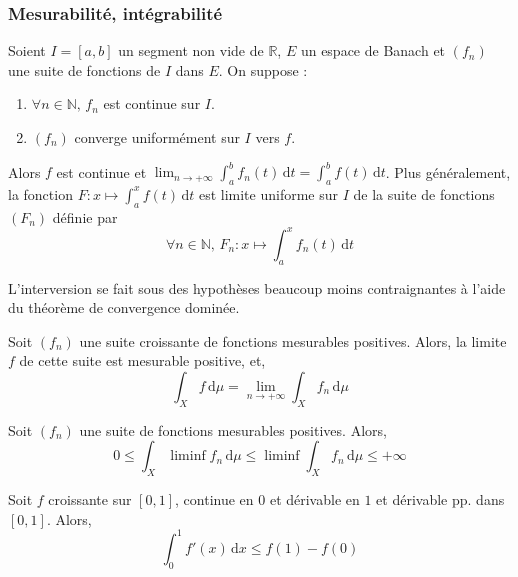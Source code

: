   \subsubsection{Mesurabilité, intégrabilité}


  \begin{theorem}
    Soient $I = [a,b]$ un segment non vide de $\mathbb{R}$, $E$ un espace de Banach et $(f_n)$ une suite de fonctions de $I$ dans $E$. On suppose :
    \begin{enumerate}[label=(\roman*)]
      \item $\forall n \in \mathbb{N}, \, f_n$ est continue sur $I$.
      \item $(f_n)$ converge uniformément sur $I$ vers $f$.
    \end{enumerate}
    Alors $f$ est continue et $\lim_{n \rightarrow +\infty} \int_a^b f_n(t) \, \mathrm{d}t = \int_a^b f(t) \, \mathrm{d}t$. Plus généralement, la fonction $F : x \mapsto \int_a^x f(t) \, \mathrm{d}t$ est limite uniforme sur $I$ de la suite de fonctions $(F_n)$ définie par
    \[ \forall n \in \mathbb{N}, \, F_n : x \mapsto \int_a^x f_n(t) \, \mathrm{d}t \]
  \end{theorem}

  \begin{remark}
    L'interversion se fait sous des hypothèses beaucoup moins contraignantes à l'aide du théorème de convergence dominée.
  \end{remark}


  \begin{theorem}
    Soit $(f_n)$ une suite croissante de fonctions mesurables positives. Alors, la limite $f$ de cette suite est mesurable positive, et,
    \[ \int_X f \, \mathrm{d}\mu = \lim_{n \rightarrow +\infty} \int_X f_n \, \mathrm{d}\mu \]
  \end{theorem}


  \begin{theorem}
    Soit $(f_n)$ une suite de fonctions mesurables positives. Alors,
    \[ 0 \leq \int_X \liminf f_n \, \mathrm{d}\mu \leq \liminf \int_X f_n \, \mathrm{d}\mu \leq +\infty \]
  \end{theorem}

  \begin{example}
    \label{241-1}
    Soit $f$ croissante sur $[0,1]$, continue en $0$ et dérivable en $1$ et dérivable pp. dans $[0,1]$. Alors,
    \[ \int_{0}^{1} f'(x) \, \mathrm{d}x \leq f(1) - f(0) \]
  \end{example}

